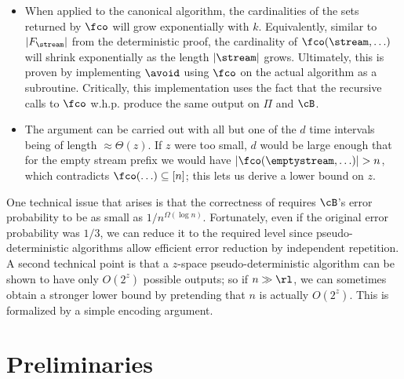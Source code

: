 \begin{itemize}
\begin{itemize}
\begin{itemize}
  \item When applied to the canonical algorithm, the cardinalities of the sets
  returned by $\fco$ will grow exponentially with $k$. Equivalently, similar
  to $|F_\stream|$ from the deterministic proof, the cardinality of
  $\fco(\stream, \ldots)$ will shrink exponentially as the length $|\stream|$
  grows.  Ultimately, this is proven by implementing $\avoid$ using $\fco$ on
  the actual algorithm as a subroutine. Critically, this implementation uses
  the fact that the recursive calls to $\fco$ w.h.p. produce the same output
  on $\Pi$ and $\cB$.

  \item The argument can be carried out with all but one of the $d$ time
  intervals being of length $\approx \Theta(z)$. If $z$ were too small, $d$
  would be large enough that for the empty stream prefix we would have
  $|\fco(\emptystream,\ldots)| > n$, which contradicts $\fco(\ldots) \subseteq
  [n]$; this lets us derive a lower bound on $z$.

\end{itemize}

 One technical issue that
arises is that the correctness of \fco requires $\cB$'s error probability to
be as small as $1/n^{\Omega(\log n)}$.  Fortunately, even if the original
error probability was $1/3$, we can reduce it to the required level since
pseudo-deterministic algorithms allow efficient error reduction by independent
repetition. A second technical point is that a $z$-space pseudo-deterministic
algorithm can be shown to have only $O(2^{z})$ possible outputs; so if $n \gg
\rl$, we can sometimes obtain a stronger lower bound by pretending that $n$ is
actually $O(2^{z})$. This is formalized by a simple encoding argument.

\section{Preliminaries}\label{sec:prelim}


\end{itemize}
\end{itemize}
